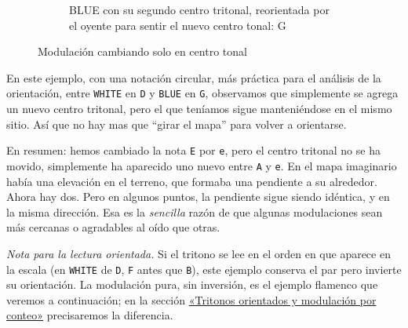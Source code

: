 \documentclass[]{report}
\begin{document}
\begin{figure}[H]
\begin{subfigure}{0.29\textwidth}
	\end{subfigure}
	\hfill
	\begin{subfigure}{0.29\textwidth}
		\centering
		\caption{\textsf{BLUE} con su segundo centro tritonal, reorientada por el oyente para sentir el nuevo centro tonal: \textsf{G}}
		\captionsetup{width=\textwidth}

	\end{subfigure}
	\hfill
	\caption{Modulación cambiando solo en centro tonal}\label{fig:modulation-changing-tonal-center}
\end{figure}

En este ejemplo, con una notación circular, más práctica para el análisis de la orientación, entre \texttt{WHITE} en \texttt{D} y \texttt{BLUE} en \texttt{G}, observamos que simplemente se agrega un nuevo centro tritonal, pero el que teníamos sigue manteniéndose en el mismo sitio. Así que no hay mas que ``girar el mapa'' para volver a orientarse.

En resumen: hemos cambiado la nota \texttt{E} por \texttt{e}, pero el centro tritonal no se ha movido, simplemente ha aparecido uno nuevo entre \texttt{A} y \texttt{e}. En el mapa imaginario había una elevación en el terreno, que formaba una pendiente a su alrededor. Ahora hay dos. Pero en algunos puntos, la pendiente sigue siendo idéntica, y en la misma dirección. Esa es la \emph{sencilla} razón de que algunas modulaciones sean más cercanas o agradables al oído que otras.

\emph{Nota para la lectura orientada.} Si el tritono se lee en el orden en que
aparece en la escala (en \texttt{WHITE} de \texttt{D}, \texttt{F} antes que
\texttt{B}), este ejemplo conserva el par pero invierte su orientación. La
modulación pura, sin inversión, es el ejemplo flamenco que veremos a
continuación; en la sección
\hyperref[sec:tritonos-orientados]{«Tritonos orientados y modulación por conteo»}
precisaremos la diferencia.
\end{document}
